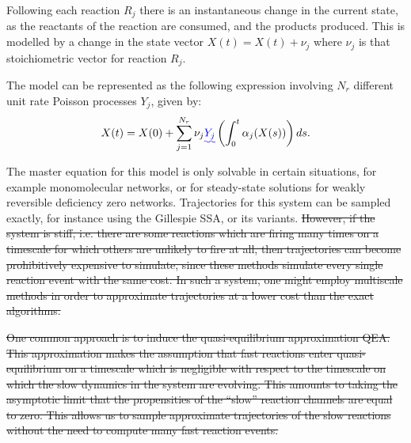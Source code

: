 \documentclass[final]{siamltex}
\providecommand{\DIFadd}[1]{{\protect\color{blue}\uwave{#1}}} %
\providecommand{\DIFdel}[1]{{\protect\color{red}\sout{#1}}}                      %
\providecommand{\DIFaddbegin}{} %
\providecommand{\DIFaddend}{} %
\providecommand{\DIFdelbegin}{} %
\providecommand{\DIFdelend}{} %
\newcommand{\DIFscaledelfig}{0.5}
\newlength{\DIFdelgraphicswidth} %
\newlength{\DIFdelgraphicsheight} %
\newcommand{\DIFaddincludegraphics}[2][]{{\color{blue}\fbox{\DIFOincludegraphics[#1]{#2}}}} %
\newcommand{\DIFdelincludegraphics}[2][]{%
\sbox{\DIFdelgraphicsbox}{\DIFOincludegraphics[#1]{#2}}%
\settoboxwidth{\DIFdelgraphicswidth}{\DIFdelgraphicsbox} %
\settoboxtotalheight{\DIFdelgraphicsheight}{\DIFdelgraphicsbox} %
\scalebox{\DIFscaledelfig}{%
\parbox[b]{\DIFdelgraphicswidth}{\usebox{\DIFdelgraphicsbox}\\[-\baselineskip] \rule{\DIFdelgraphicswidth}{0em}}\llap{\resizebox{\DIFdelgraphicswidth}{\DIFdelgraphicsheight}{%
\setlength{\unitlength}{\DIFdelgraphicswidth}%
\begin{picture}(1,1)%
\thicklines\linethickness{2pt} %
{\color[rgb]{1,0,0}\put(0,0){\framebox(1,1){}}}%
{\color[rgb]{1,0,0}\put(0,0){\line( 1,1){1}}}%
{\color[rgb]{1,0,0}\put(0,1){\line(1,-1){1}}}%
\end{picture}%
}\hspace*{3pt}}} %
} %
\DeclareRobustCommand{\DIFaddbegin}{\DIFOaddbegin \let\includegraphics\DIFaddincludegraphics} %
\DeclareRobustCommand{\DIFaddend}{\DIFOaddend \let\includegraphics\DIFOincludegraphics} %
\DeclareRobustCommand{\DIFdelbegin}{\DIFOdelbegin \let\includegraphics\DIFdelincludegraphics} %
\DeclareRobustCommand{\DIFdelend}{\DIFOaddend \let\includegraphics\DIFOincludegraphics} %
\begin{document}
Following each reaction $R_j$ there is an instantaneous change in the
current state, as the reactants of the reaction are consumed, and the
products produced. This is modelled by a change in the state vector
$X(t) = X(t) + \nu_j$ where $\nu_j$ is that stoichiometric vector for
reaction $R_j$.

The model can be represented as the following expression involving
$N_r$ different unit rate Poisson
processes\cite{anderson2011continuous} $Y_j$, given by:
\begin{equation}\label{eq:RTC}
X(t) = X(0) + \sum_{j=1}^{N_r} \nu_j \DIFaddbegin \DIFadd{Y_j }\left (\DIFaddend \int_0^t
  \alpha_j(X(s)) \DIFaddbegin \right ) \DIFaddend ds.
\end{equation}

The master equation for this model is only solvable in certain
situations, for example monomolecular networks\cite{jahnke2007solving}, or for
steady-state solutions for weakly reversible deficiency
zero networks\cite{anderson2010product,anderson2016product}. Trajectories for this system can be
sampled exactly, for instance using the Gillespie SSA\cite{gillespie1977exact}, or
its
variants\cite{gillespie2007stochastic,cao2004efficient,anderson2007modified}. 
\DIFdelbegin \DIFdel{However, if the system is stiff, i.e. there
are some reactions which are firing many times on a timescale for
which others are unlikely to fire at all, then trajectories can become
prohibitively expensive to simulate, since these methods simulate
every single reaction event with the same cost. In such a system, one
might employ multiscale methods in order to approximate trajectories
at a lower cost than the exact algorithms.
}\DIFdelend 


\DIFdelbegin \DIFdel{One common approach is to induce the quasi-equilibrium approximation
QEA. This approximation makes the assumption that fast reactions
enter quasi-equilibrium on a timescale which is negligible with
respect to the timescale on which the slow dynamics in the system are
evolving. This amounts to taking the asymptotic limit that the
propensities of the ``slow'' reaction channels are equal to zero. This
allows us to sample approximate trajectories of the slow reactions
without the need to compute many fast reaction events.
}\DIFdelend %
\end{document}
